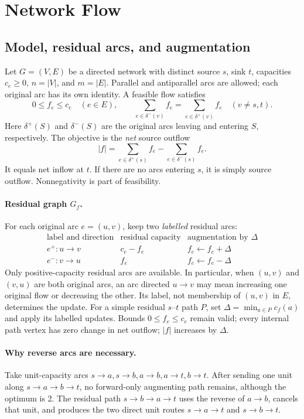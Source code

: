 \section{Network Flow}\label{nf:chapter}

\subsection{Model, residual arcs, and augmentation}\label{nf:model}
Let $G=(V,E)$ be a directed network with distinct source $s$, sink $t$,
capacities $c_e\ge0$, $n=|V|$, and $m=|E|$. Parallel and antiparallel arcs
are allowed; each original arc has its own identity. A feasible flow satisfies
\[
  0\le f_e\le c_e\quad(e\in E),\qquad
  \sum_{e\in\delta^-(v)}f_e=\sum_{e\in\delta^+(v)}f_e
  \quad(v\ne s,t).
\]
Here $\delta^+(S)$ and $\delta^-(S)$ are the original arcs leaving and entering
$S$, respectively. The objective is the \emph{net} source outflow
\[
  |f|=\sum_{e\in\delta^+(s)}f_e-\sum_{e\in\delta^-(s)}f_e.
\]
It equals net inflow at $t$. If there are no arcs entering $s$, it is simply
source outflow. Nonnegativity is part of feasibility.

\paragraph{Residual graph $G_f$.}
For each original arc $e=(u,v)$, keep two \emph{labelled} residual arcs:
\[
\begin{array}{c|c|c}
\text{label and direction}&\text{residual capacity}&\text{augmentation by }\Delta\\\hline
 e^+:u\to v&c_e-f_e&f_e\gets f_e+\Delta\\
 e^-:v\to u&f_e&f_e\gets f_e-\Delta
\end{array}
\]
Only positive-capacity residual arcs are available. In particular, when
$(u,v)$ and $(v,u)$ are both original arcs, an arc directed $u\to v$ may
mean increasing one original flow or decreasing the other. Its label, not
membership of $(u,v)$ in $E$, determines the update.
For a simple residual $s$--$t$ path $P$, set
$\Delta=\min_{a\in P}c_f(a)$ and apply its labelled updates.
Bounds $0\le f_e\le c_e$ remain valid; every internal path vertex has zero
change in net outflow; $|f|$ increases by $\Delta$.

\paragraph{Why reverse arcs are necessary.}
Take unit-capacity arcs $s\to a,s\to b,a\to b,a\to t,b\to t$.
After sending one unit along $s\to a\to b\to t$, no forward-only
augmenting path remains, although the optimum is 2. The residual path
$s\to b\to a\to t$ uses the reverse of $a\to b$, cancels that unit, and
produces the two direct unit routes $s\to a\to t$ and $s\to b\to t$.

